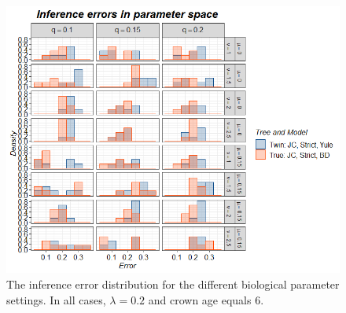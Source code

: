 \begin{figure}[!htbp]
  \includegraphics[width=\textwidth]{razzo-figures/razzo_results.png}
  \caption{
    The inference error distribution 
    for the different biological
    parameter settings. In all cases, $\lambda = 0.2$ and 
    crown age equals 6. 
  }
  \label{fig:results}
\end{figure}